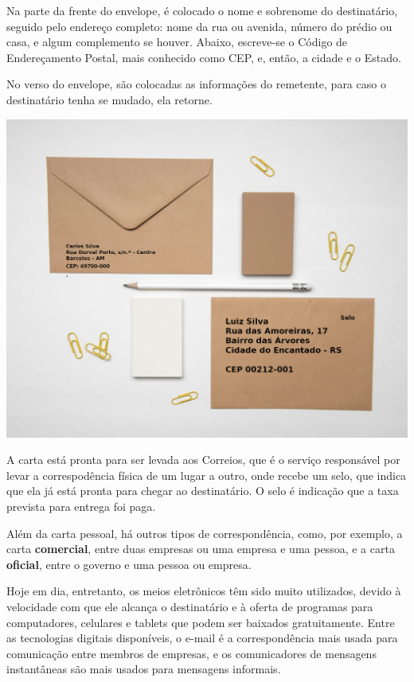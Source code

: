 {Na parte da frente do envelope, é colocado o nome e sobrenome do destinatário,
seguido pelo endereço completo: nome da rua ou avenida, número do prédio ou casa, e algum complemento se houver. Abaixo, escreve-se o Código de Endereçamento Postal, 
mais conhecido como CEP, e, então, a cidade e o Estado.

No verso do envelope, são colocadas as informações do remetente, para caso o destinatário
tenha se mudado, ela retorne.

\begin{center}
\includegraphics[width=\textwidth]{media/image7b.jpg}
\end{center}  

A carta está pronta para ser levada aos Correios, que é o serviço responsável por levar a correspodência física de um lugar a outro, onde recebe um selo, que indica que ela já está pronta para chegar ao destinatário. O selo é indicação que a taxa prevista para entrega foi paga. 

Além da carta pessoal, há outros tipos de correspondência, como, por exemplo, 
a carta \textbf{comercial}, entre duas empresas ou uma empresa e uma pessoa, e a carta 
\textbf{oficial}, entre o governo e uma pessoa ou empresa.

Hoje em dia, entretanto, os meios eletrônicos têm sido muito utilizados, devido à velocidade com que ele alcança o destinatário e à oferta de programas para computadores, celulares e tablets que podem ser baixados gratuitamente. Entre as tecnologias digitais disponíveis, o e-mail é a correspondência mais usada para comunicação entre membros de empresas, e os comunicadores de mensagens instantâneas são mais usados para mensagens informais. 
}


